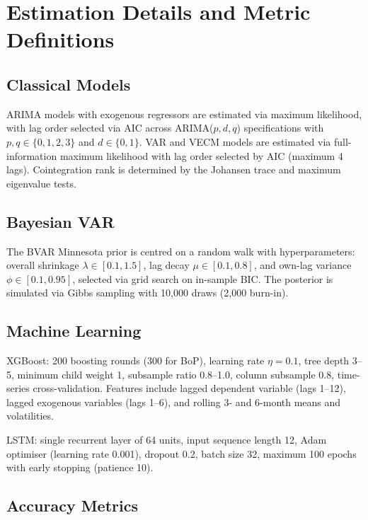 \documentclass[12pt,a4paper]{article}
\begin{document}
\appendix

\section{Estimation Details and Metric Definitions}

\subsection{Classical Models}

ARIMA models with exogenous regressors are estimated via maximum likelihood, with lag order selected via AIC across ARIMA($p,d,q$) specifications with $p, q \in \{0,1,2,3\}$ and $d \in \{0,1\}$. VAR and VECM models are estimated via full-information maximum likelihood with lag order selected by AIC (maximum 4 lags). Cointegration rank is determined by the Johansen trace and maximum eigenvalue tests.

\subsection{Bayesian VAR}

The BVAR Minnesota prior is centred on a random walk with hyperparameters: overall shrinkage $\lambda \in [0.1, 1.5]$, lag decay $\mu \in [0.1, 0.8]$, and own-lag variance $\phi \in [0.1, 0.95]$, selected via grid search on in-sample BIC. The posterior is simulated via Gibbs sampling with 10,000 draws (2,000 burn-in).

\subsection{Machine Learning}

XGBoost: 200 boosting rounds (300 for BoP), learning rate $\eta = 0.1$, tree depth 3--5, minimum child weight 1, subsample ratio 0.8--1.0, column subsample 0.8, time-series cross-validation. Features include lagged dependent variable (lags 1--12), lagged exogenous variables (lags 1--6), and rolling 3- and 6-month means and volatilities.

LSTM: single recurrent layer of 64 units, input sequence length 12, Adam optimiser (learning rate 0.001), dropout 0.2, batch size 32, maximum 100 epochs with early stopping (patience 10).

\subsection{Accuracy Metrics}
\end{document}
